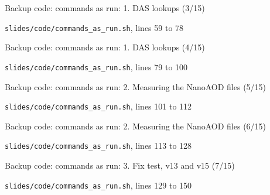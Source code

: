 \begin{frame}{Backup code: commands as run: 1. DAS lookups (3/15)}
  \vspace{0pt}\par
  {\tiny\color{lightgrey}\texttt{slides/code/commands\_as\_run.sh}, lines 59 to 78\par}
  
\end{frame}
\begin{frame}{Backup code: commands as run: 1. DAS lookups (4/15)}
  \vspace{0pt}\par
  {\tiny\color{lightgrey}\texttt{slides/code/commands\_as\_run.sh}, lines 79 to 100\par}
  
\end{frame}
\begin{frame}{Backup code: commands as run: 2. Measuring the NanoAOD files (5/15)}
  \vspace{0pt}\par
  {\tiny\color{lightgrey}\texttt{slides/code/commands\_as\_run.sh}, lines 101 to 112\par}
  
\end{frame}
\begin{frame}{Backup code: commands as run: 2. Measuring the NanoAOD files (6/15)}
  \vspace{0pt}\par
  {\tiny\color{lightgrey}\texttt{slides/code/commands\_as\_run.sh}, lines 113 to 128\par}
  
\end{frame}
\begin{frame}{Backup code: commands as run: 3. Fix test, v13 and v15 (7/15)}
  \vspace{0pt}\par
  {\tiny\color{lightgrey}\texttt{slides/code/commands\_as\_run.sh}, lines 129 to 150\par}
  
\end{frame}
